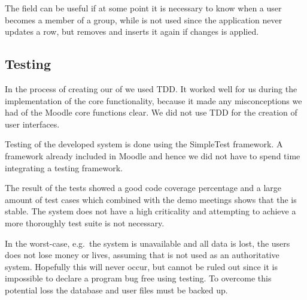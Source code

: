 The field  can be useful if at some point it is necessary to know when a user becomes a member of a group, while  is not used since the application never updates a row, but removes and inserts it again if changes is applied. 



\subsection{Testing}
In the process of creating our \subsystem{} of \system{} we used TDD.
It worked well for us during the implementation of the core functionality, because it made any misconceptions we had of the Moodle core functions clear.
We did not use TDD for the creation of user interfaces.

Testing of the developed system is done using the SimpleTest framework. 
A framework already included in Moodle and hence we did not have to spend time integrating a testing framework.

The result of the tests showed a good code coverage percentage and a large amount of test cases which combined with the demo meetings shows that the \subsystem{} is stable. 
The system does not have a high criticality and attempting to achieve a more thoroughly test suite is not necessary. 

In the worst-case, e.g.\ the system is unavailable and all data is lost, the users does not lose money or lives, assuming that \system{} is not used as an authoritative system.
Hopefully this will never occur, but cannot be ruled out since it is impossible to declare a program bug free using testing.
To overcome this potential loss the database and user files must be backed up.
